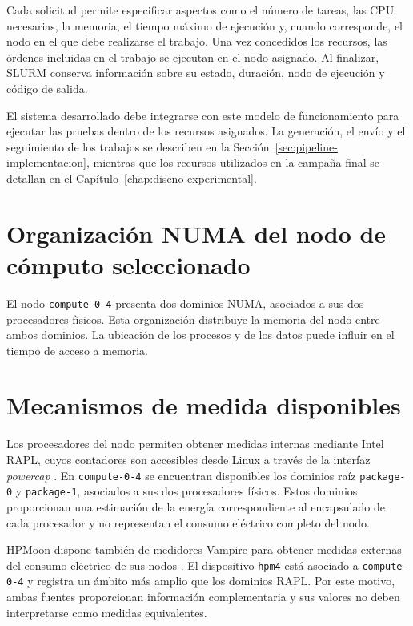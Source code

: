 Cada solicitud permite especificar aspectos como el número de tareas, las CPU necesarias, la memoria, el tiempo máximo de ejecución y, cuando corresponde, el nodo en el que debe realizarse el trabajo. Una vez concedidos los recursos, las órdenes incluidas en el trabajo se ejecutan en el nodo asignado. Al finalizar, SLURM conserva información sobre su estado, duración, nodo de ejecución y código de salida.

El sistema desarrollado debe integrarse con este modelo de funcionamiento para ejecutar las pruebas dentro de los recursos asignados. La generación, el envío y el seguimiento de los trabajos se describen en la Sección~\ref{sec:pipeline-implementacion}, mientras que los recursos utilizados en la campaña final se detallan en el Capítulo~\ref{chap:diseno-experimental}.

\section{Organización NUMA del nodo de cómputo seleccionado}
\label{sec:numa-entorno}

El nodo \texttt{compute-0-4} presenta dos dominios NUMA, asociados a sus dos procesadores físicos. Esta organización distribuye la memoria del nodo entre ambos dominios. La ubicación de los procesos y de los datos puede influir en el tiempo de acceso a memoria.

\section{Mecanismos de medida disponibles}
\label{sec:medicion-entorno}

Los procesadores del nodo permiten obtener medidas internas mediante Intel RAPL, cuyos contadores son accesibles desde Linux a través de la interfaz \emph{powercap} \parencite{linuxPowercap}. En \texttt{compute-0-4} se encuentran disponibles los dominios raíz \texttt{package-0} y \texttt{package-1}, asociados a sus dos procesadores físicos. Estos dominios proporcionan una estimación de la energía correspondiente al encapsulado de cada procesador y no representan el consumo eléctrico completo del nodo.

HPMoon dispone también de medidores Vampire para obtener medidas externas del consumo eléctrico de sus nodos \parencite{diaz2024vampire}. El dispositivo \texttt{hpm4} está asociado a \texttt{compute-0-4} y registra un ámbito más amplio que los dominios RAPL. Por este motivo, ambas fuentes proporcionan información complementaria y sus valores no deben interpretarse como medidas equivalentes.

